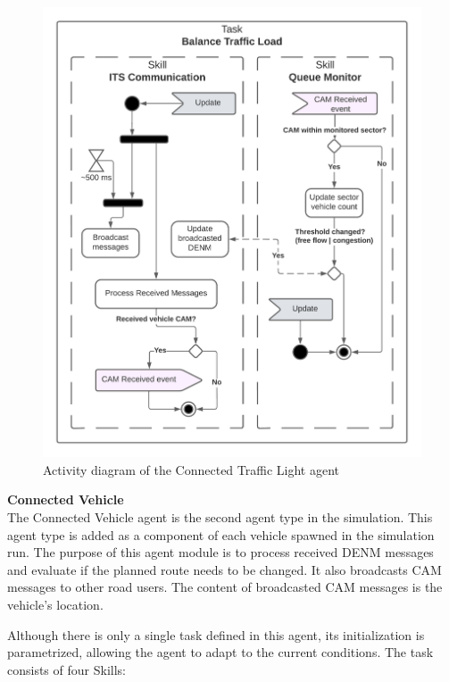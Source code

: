 \documentclass[0main.tex]{subfiles}
\begin{document}
\begin{figure}[htbp]
    \centering
    \includegraphics[width=.8\textwidth]{SmartTrafficLight.png}
    \caption{Activity diagram of the Connected Traffic Light agent}
    \label{ad-trafficLight}
\end{figure}

\textbf{Connected Vehicle} \smallskip \\
The Connected Vehicle agent is the second agent type in the simulation. This agent type is 
added as a component of each vehicle spawned in the simulation run. The purpose of this 
agent module is to process received DENM messages and evaluate if the planned route needs 
to be changed. It also broadcasts CAM messages to other road users. The content of 
broadcasted CAM messages is the vehicle's location.

Although there is only a single task defined in this agent, its initialization is 
parametrized, allowing the agent to adapt to the current conditions. The task consists of 
four Skills:
\end{document}
